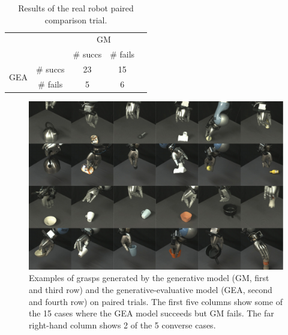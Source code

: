 
\begin{table}
\begin{center}
\caption{Results of the real robot paired comparison trial.}
\label{my-label}
\begin{tabular}{|cc|c|c|l}
\cline{1-4}
                                           &         & \multicolumn{2}{c|}{GM} &  \\ \cline{3-4}
                                           &         & \# succs    & \# fails    &  \\ \cline{1-4}
\multicolumn{1}{|c|}{\multirow{2}{*}{GEA}} & \# succs & 23         & 15         &  \\
\multicolumn{1}{|c|}{}                     & \# fails & 5          & 6          &  \\ \cline{1-4}
\end{tabular}
\end{center}
\label{tab:robot-results}
\end{table}


\begin{figure}
\includegraphics[width=\columnwidth]{images/successfailure.pdf}
\caption{Examples of grasps generated by the generative model (GM, first and third row) and the generative-evaluative model (GEA, second and fourth row) on paired trials. The first five columns show some of the 15 cases where the GEA model succeeds but GM fails. The far right-hand column shows 2 of the 5 converse cases. \label{fig:successfail}}
\end{figure}

%
